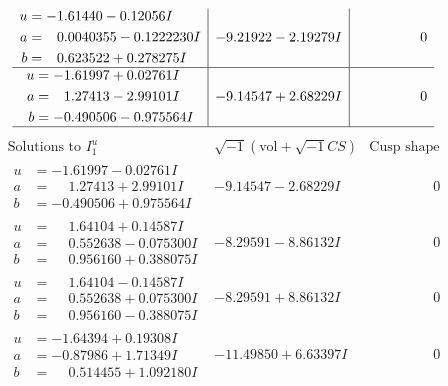 \documentclass[1p]{elsarticle_modified}
\theoremstyle{definition}
\newcommand{\I}{\sqrt{-1}}
\begin{document}
$$\begin{array}{c|c|c}
\begin{aligned}
u &= -1.61440 - 0.12056 I \\
a &= \phantom{-}0.0040355 - 0.1222230 I \\
b &= \phantom{-}0.623522 + 0.278275 I\end{aligned}
 & -9.21922 - 2.19279 I & \phantom{-0.000000 } 0 \\ \hline\begin{aligned}
u &= -1.61997 + 0.02761 I \\
a &= \phantom{-}1.27413 - 2.99101 I \\
b &= -0.490506 - 0.975564 I\end{aligned}
 & -9.14547 + 2.68229 I & \phantom{-0.000000 } 0\\
 \hline 
 \end{array}$$\newpage$$\begin{array}{c|c|c}  
\text{Solutions to }I^u_{1}& \I (\text{vol} + \sqrt{-1}CS) & \text{Cusp shape}\\
 \hline 
\begin{aligned}
u &= -1.61997 - 0.02761 I \\
a &= \phantom{-}1.27413 + 2.99101 I \\
b &= -0.490506 + 0.975564 I\end{aligned}
 & -9.14547 - 2.68229 I & \phantom{-0.000000 } 0 \\ \hline\begin{aligned}
u &= \phantom{-}1.64104 + 0.14587 I \\
a &= \phantom{-}0.552638 - 0.075300 I \\
b &= \phantom{-}0.956160 + 0.388075 I\end{aligned}
 & -8.29591 - 8.86132 I & \phantom{-0.000000 } 0 \\ \hline\begin{aligned}
u &= \phantom{-}1.64104 - 0.14587 I \\
a &= \phantom{-}0.552638 + 0.075300 I \\
b &= \phantom{-}0.956160 - 0.388075 I\end{aligned}
 & -8.29591 + 8.86132 I & \phantom{-0.000000 } 0 \\ \hline\begin{aligned}
u &= -1.64394 + 0.19308 I \\
a &= -0.87986 + 1.71349 I \\
b &= \phantom{-}0.514455 + 1.092180 I\end{aligned}
 & -11.49850 + 6.63397 I & \phantom{-0.000000 } 0 \\ \hline\begin{aligned}

\end{aligned}
\end{array}$$
\end{document}

